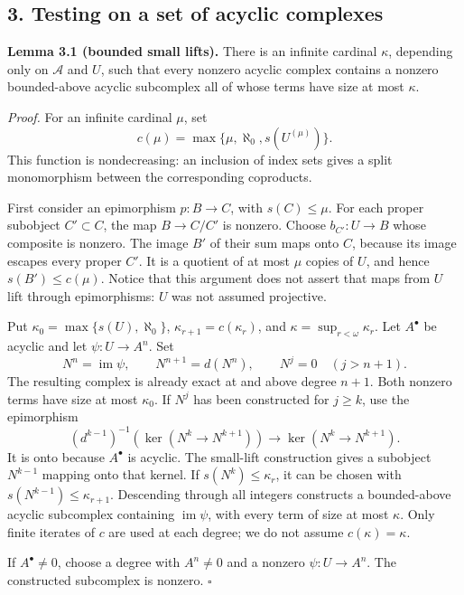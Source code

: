 \documentclass[
  english,
  11pt,
  a4paper,
]{article}
\begin{document}
\subsection{3. Testing on a set of acyclic
complexes}\label{k-injective-resolutions-in-grothendieck-categories--3-testing-on-a-set-of-acyclic-complexes}

\textbf{Lemma 3.1 (bounded small lifts).} There is an infinite cardinal
\(\kappa\), depending only on \(\mathcal A\) and \(U\), such that every
nonzero acyclic complex contains a nonzero bounded-above acyclic
subcomplex all of whose terms have size at most \(\kappa\).

\emph{Proof.} For an infinite cardinal \(\mu\), set
\[c(\mu)=\max\{\mu,\aleph_0,s(U^{(\mu)})\}.\] This function is
nondecreasing: an inclusion of index sets gives a split monomorphism
between the corresponding coproducts.

First consider an epimorphism \(p:B\to C\), with \(s(C)\leq\mu\). For
each proper subobject \(C'\subset C\), the map \(B\to C/C'\) is nonzero.
Choose \(b_{C'}:U\to B\) whose composite is nonzero. The image \(B'\) of
their sum maps onto \(C\), because its image escapes every proper
\(C'\). It is a quotient of at most \(\mu\) copies of \(U\), and hence
\(s(B')\leq c(\mu)\). Notice that this argument does not assert that
maps from \(U\) lift through epimorphisms: \(U\) was not assumed
projective.

Put \(\kappa_0=\max\{s(U),\aleph_0\}\), \(\kappa_{r+1}=c(\kappa_r)\),
and \(\kappa=\sup_{r<\omega}\kappa_r\). Let \(A^\bullet\) be acyclic and
let \(\psi:U\to A^n\). Set \[N^n=\operatorname{im}\psi,\qquad
N^{n+1}=d(N^n),\qquad N^j=0\quad(j>n+1).\] The resulting complex is
already exact at and above degree \(n+1\). Both nonzero terms have size
at most \(\kappa_0\). If \(N^j\) has been constructed for \(j\geq k\),
use the epimorphism \[(d^{k-1})^{-1}\!\left(\ker(N^k\to N^{k+1})\right)
\longrightarrow \ker(N^k\to N^{k+1}).\] It is onto because \(A^\bullet\)
is acyclic. The small-lift construction gives a subobject \(N^{k-1}\)
mapping onto that kernel. If \(s(N^k)\leq\kappa_r\), it can be chosen
with \(s(N^{k-1})\leq\kappa_{r+1}\). Descending through all integers
constructs a bounded-above acyclic subcomplex containing
\(\operatorname{im}\psi\), with every term of size at most \(\kappa\).
Only finite iterates of \(c\) are used at each degree; we do not assume
\(c(\kappa)=\kappa\).

If \(A^\bullet\neq0\), choose a degree with \(A^n\neq0\) and a nonzero
\(\psi:U\to A^n\). The constructed subcomplex is nonzero. \(\square\)
\end{document}
